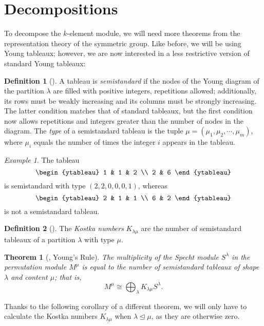 \documentclass[12pt,twoside]{reedthesis}
\theoremstyle{plain}   %
\newtheorem{thm}{Theorem}[section] %
\theoremstyle{definition}
\newtheorem{defn}{Definition}[section]
\theoremstyle{remark}
\newtheorem{ex}{Example}[section]
\numberwithin{equation}{section}
\def\normeq{\trianglelefteq}
\begin{document}
 \section{Decompositions}
 To decompose the $k$-element module, we will need more theorems from the representation theory of the symmetric group.
 Like before, we will be using Young tableaux; however, we are now interested in a less restrictive version of standard Young tableaux:
  \begin{defn}[{\cite[2.9.1]{sagan}}]
    A tableau is \emph{semistandard} if the nodes of the Young diagram of the partition $\lambda$ are filled with positive integers, repetitions allowed;
    additionally, its rows must be weakly increasing and its columns must be strongly increasing.
    The latter condition matches that of standard tableaux, but the first condition now allows repetitions and integers greater than the number of nodes in the diagram.
    The \emph{type} of a semistandard tableau is the tuple $\mu = (\mu_1, \mu_2, \cdots, \mu_m)$, where $\mu_i$ equals the number of times the integer $i$ appears in the tableau.
  \end{defn}
  \begin{ex}
    The tableau
    \[
      \begin{ytableau}
        1 & 1 & 2 \\
        2 & 6 
      \end{ytableau}
    \]
    is semistandard with type $(2,2,0,0,0,1)$, whereas
    \[
      \begin{ytableau}
        2 & 1 & 1 \\
        6 & 2 
      \end{ytableau}
    \]
    is not a semistandard tableau.
  \end{ex}
  \begin{defn}[{\cite[2.11.1]{sagan}}]
    The \emph{Kostka numbers} $K_{\lambda \mu }$ are the number of semistandard tableaux of a partition $\lambda$ with type $\mu$.
  \end{defn}
  \begin{thm}[{\cite[2.11.2]{sagan}, Young's Rule}]
    The multiplicity of the Specht module $S^\lambda$ in the permutation module $M^\mu$ is equal to the number of semistandard tableaux of shape $\lambda$ and content $\mu$; that is,
    \[ M^\mu \cong \bigoplus_\lambda K_{\lambda \mu} S^\lambda .\]
  \end{thm}
  Thanks to the following corollary of a different theorem, we will only have to calculate the Kostka numbers $K_{\lambda \mu}$ when $\lambda \normeq \mu$, as they are otherwise zero.
\end{document}

